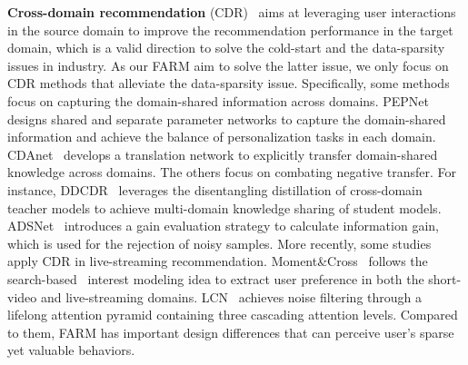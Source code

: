 \textbf{Cross-domain recommendation} (CDR)~\cite{cdrib, cdrnp, dmcdr} aims at leveraging user interactions in the source domain to improve the recommendation performance in the target domain, which is a valid direction to solve the cold-start and the data-sparsity issues in industry. 
As our FARM aim to solve the latter issue, we only focus on CDR methods that alleviate the data-sparsity issue. 
Specifically, some methods focus on capturing the domain-shared information across domains. PEPNet~\cite{pepnet} designs shared and separate parameter networks to capture the domain-shared information and achieve the balance of personalization tasks in each domain. 
CDAnet~\cite{cdanet} develops a translation network to explicitly transfer domain-shared knowledge across domains.
The others focus on combating negative transfer. For instance, DDCDR~\cite{ddcdr} leverages the disentangling distillation of cross-domain teacher models to achieve multi-domain knowledge sharing of student models.  
ADSNet~\cite{adsnet} introduces a gain evaluation strategy to calculate information gain, which is used for the rejection of noisy samples.
More recently, some studies apply CDR in live-streaming recommendation. Moment\&Cross~\cite{moment_cross} follows the search-based~\cite{sim} interest modeling idea to extract user preference in both the short-video and live-streaming domains. LCN~\cite{lcn} achieves noise filtering through a lifelong attention pyramid containing three cascading attention levels. Compared to them, FARM has important design differences that can perceive user's sparse yet valuable behaviors.





